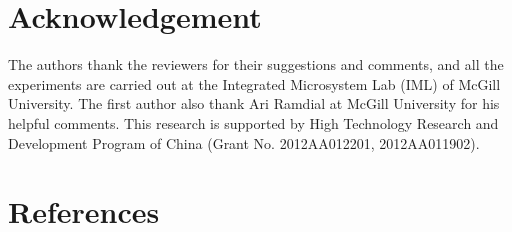 \documentclass[preprint]{elsarticle}
\begin{document}
\section*{Acknowledgement}
The authors thank the reviewers for their suggestions and comments, and all the experiments are carried out at the Integrated Microsystem Lab (IML) of McGill University. The first author also thank Ari Ramdial at McGill University for his helpful comments. This research is supported by High Technology Research and Development Program of China (Grant No. 2012AA012201, 2012AA011902).


\section*{References}


\end{document}
